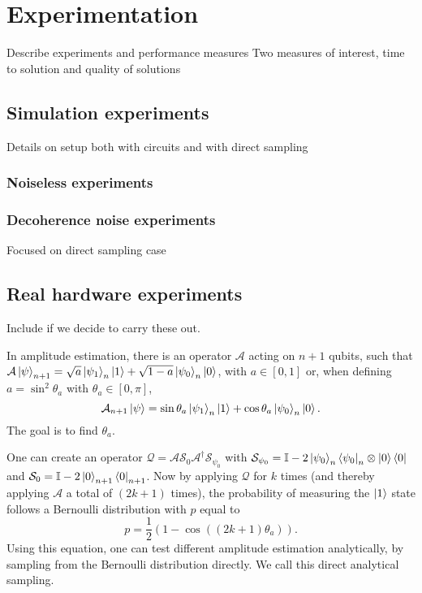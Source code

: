 \section{Experimentation}
Describe experiments and performance measures
Two measures of interest, time to solution and quality of solutions

\subsection{Simulation experiments}
Details on setup both with circuits and with direct sampling
\subsubsection{Noiseless experiments}

\subsubsection{Decoherence noise experiments}
Focused on direct sampling case

\subsection{Real hardware experiments}
Include if we decide to carry these out.



In amplitude estimation, there is an operator $\mathcal{A}$ acting on $n+1$ qubits, such that $\mathcal{A} \ket{\psi}_{n+1} = \sqrt{a}\ket{\psi_1}_{n}\ket{1} + \sqrt{1-a}\ket{\psi_0}_n\ket{0}$,
with $a\in [0,1]$ or, when defining $a=\sin^2{\theta_a}$ with $\theta_a \in [0, \pi]$,
\begin{equation}
	\mathcal{A}_{n+1} \ket{\psi} = \sin{\theta_a} \ket{\psi_1}_n \ket{1}
	+ \cos{\theta_a}\ket{\psi_0}_n\ket{0}.
\end{equation}
The goal is to find $\theta_a$.

One can create an operator $\mathcal{Q} = \mathcal{A} \mathcal{S}_0 \mathcal{A}^{\dagger}\mathcal{S}_{\psi_0}$ with $\mathcal{S}_{\psi_0} = \mathbb{I} - 2\ket{\psi_0}_n\bra{\psi_0}_n\otimes\ket{0}\bra{0}$ and $\mathcal{S}_0 = \mathbb{I} - 2\ket{0}_{n+1}\bra{0}_{n+1}$. %
Now by applying $\mathcal{Q}$ for $k$ times (and thereby applying $\mathcal{A}$ a total of $(2k+1)$ times), the probability of measuring the $\ket{1}$ state follows a Bernoulli distribution with $p$ equal to
\begin{equation}
	p = \frac{1}{2}(1-\cos{((2k+1)\theta_a)}).
	\label{eq:bernoulli-p}
\end{equation}
Using this equation, one can test different amplitude estimation analytically, by sampling from the Bernoulli distribution directly. We call this direct analytical sampling.

